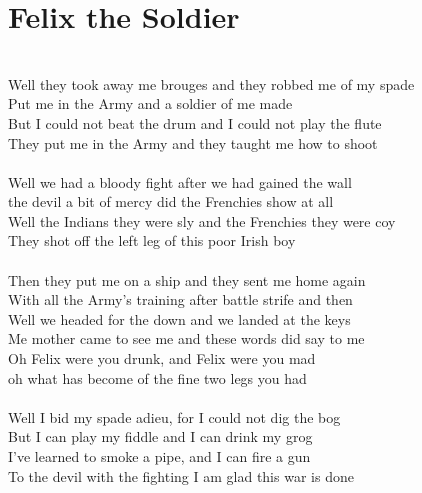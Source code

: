 \documentclass[letterpaper,14pt]{extarticle}
\begin{document}
\section{Felix the Soldier}
\noindent
\\Well they took away me brouges and they robbed me of my spade
\\Put me in the Army and a soldier of me made
\\But I could not beat the drum and I could not play the flute
\\They put me in the Army and they taught me how to shoot
\\
\\Well we had a bloody fight after we had gained the wall
\\the devil a bit of mercy did the Frenchies show at all
\\Well the Indians they were sly and the Frenchies they were coy
\\They shot off the left leg of this poor Irish boy
\\
\\Then they put me on a ship and they sent me home again
\\With all the Army's training after battle strife and then
\\Well we headed for the down and we landed at the keys
\\Me mother came to see me and these words did say to me
\\Oh Felix were you drunk, and Felix were you mad
\\oh what has become of the fine two legs you had
\\
\\Well I bid my spade adieu, for I could not dig the bog
\\But I can play my fiddle and I can drink my grog
\\I've learned to smoke a pipe, and I can fire a gun
\\To the devil with the fighting I am glad this war is done
\end{document}
